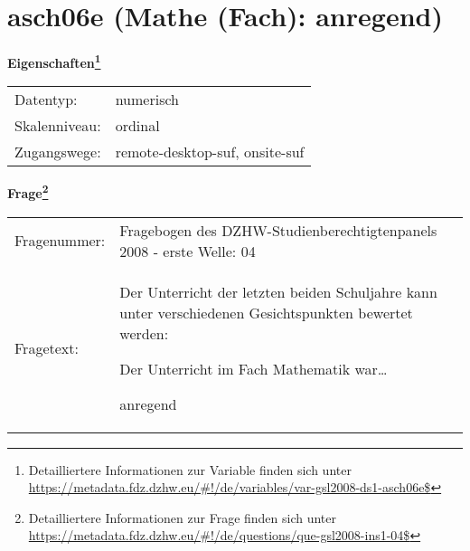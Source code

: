 
    \setcounter{footnote}{0}

    \vspace*{-1.8cm}
	\section{asch06e (Mathe (Fach): anregend)}
	\label{section:asch06e}



    \vspace*{0.5cm}
    \noindent\textbf{Eigenschaften\footnote{Detailliertere Informationen zur Variable finden sich unter
		\url{https://metadata.fdz.dzhw.eu/\#!/de/variables/var-gsl2008-ds1-asch06e$}}}\\
	\begin{tabularx}{\hsize}{@{}lX}
	Datentyp: & numerisch \\
	Skalenniveau: & ordinal \\
	Zugangswege: &
	  remote-desktop-suf, 
	  onsite-suf
 \\
    \end{tabularx}



				\vspace*{0.5cm}
                \noindent\textbf{Frage\footnote{Detailliertere Informationen zur Frage finden sich unter
		              \url{https://metadata.fdz.dzhw.eu/\#!/de/questions/que-gsl2008-ins1-04$}}}\\
				\begin{tabularx}{\hsize}{@{}lX}
					Fragenummer: &
					  Fragebogen des DZHW-Studienberechtigtenpanels 2008 - erste Welle:
					  04
 \\
					Fragetext: & Der Unterricht der letzten beiden Schuljahre kann unter verschiedenen Gesichtspunkten bewertet werden:\par  Der Unterricht im Fach Mathematik war…\par  anregend \\
				\end{tabularx}





